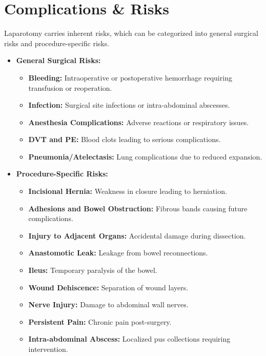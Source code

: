 \section*{Complications \& Risks}
Laparotomy carries inherent risks, which can be categorized into general surgical risks and procedure-specific risks.

\begin{itemize}
  \item \textbf{General Surgical Risks:}
    \begin{itemize}
      \item \textbf{Bleeding:} Intraoperative or postoperative hemorrhage requiring transfusion or reoperation.
      \item \textbf{Infection:} Surgical site infections or intra-abdominal abscesses.
      \item \textbf{Anesthesia Complications:} Adverse reactions or respiratory issues.
      \item \textbf{DVT and PE:} Blood clots leading to serious complications.
      \item \textbf{Pneumonia/Atelectasis:} Lung complications due to reduced expansion.
    \end{itemize}

  \item \textbf{Procedure-Specific Risks:}
    \begin{itemize}
      \item \textbf{Incisional Hernia:} Weakness in closure leading to herniation.
      \item \textbf{Adhesions and Bowel Obstruction:} Fibrous bands causing future complications.
      \item \textbf{Injury to Adjacent Organs:} Accidental damage during dissection.
      \item \textbf{Anastomotic Leak:} Leakage from bowel reconnections.
      \item \textbf{Ileus:} Temporary paralysis of the bowel.
      \item \textbf{Wound Dehiscence:} Separation of wound layers.
      \item \textbf{Nerve Injury:} Damage to abdominal wall nerves.
      \item \textbf{Persistent Pain:} Chronic pain post-surgery.
      \item \textbf{Intra-abdominal Abscess:} Localized pus collections requiring intervention.
    \end{itemize}
\end{itemize}

